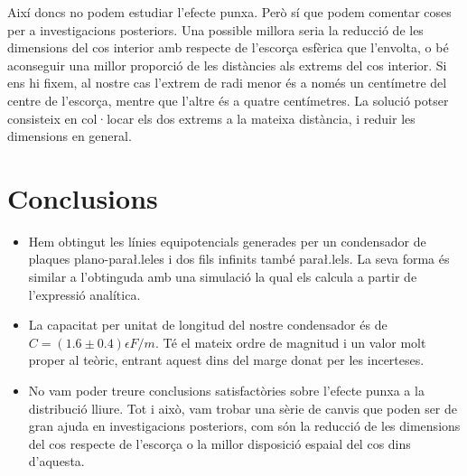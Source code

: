 Així doncs no podem estudiar l'efecte punxa. Però sí que podem comentar coses per a investigacions posteriors. Una possible millora seria la reducció de les dimensions del cos interior amb respecte de l'escorça esfèrica que l'envolta, o bé aconseguir una millor proporció de les distàncies als extrems del cos interior. Si ens hi fixem, al nostre cas l'extrem de radi menor és a només un centímetre del centre de l'escorça, mentre que l'altre és a quatre centímetres. La solució potser consisteix en col·locar els dos extrems a la mateixa distància, i reduir les dimensions en general.

\section{Conclusions}
\begin{itemize}
	\item Hem obtingut les línies equipotencials generades per un condensador de plaques plano-para\l.leles i dos fils infinits també para\l.lels. La seva forma és similar a l'obtinguda amb una simulació la qual els calcula a partir de l'expressió analítica.
	\item La capacitat per unitat de longitud del nostre condensador és de $C=(1.6\pm0.4)\epsilon F/m$. Té el mateix ordre de magnitud i un valor molt proper al teòric, entrant aquest dins del marge donat per les incerteses.
	\item No vam poder treure conclusions satisfactòries sobre l'efecte punxa a la distribució lliure. Tot i això, vam trobar una sèrie de canvis que poden ser de gran ajuda en investigacions posteriors, com són la reducció de les dimensions del cos respecte de l'escorça o la millor disposició espaial del cos dins d'aquesta.
\end{itemize}
